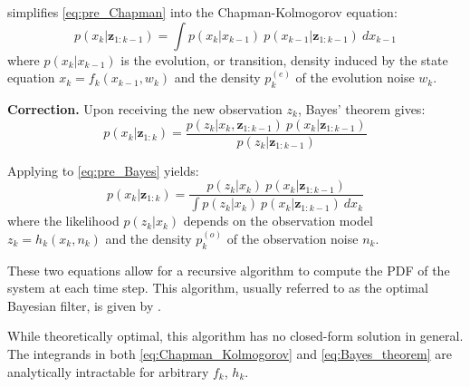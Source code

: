  simplifies \eqref{eq:pre_Chapman} into the Chapman-Kolmogorov equation:
\begin{equation}
	p(x_k|\mathbf{z}_{1:k-1})=\int{p(x_k|x_{k-1})\:p(x_{k-1}|\mathbf{z}_{1:k-1})\:dx_{k-1}}\label{eq:Chapman_Kolmogorov}
\end{equation}
where $p(x_k|x_{k-1})$ is the evolution, or transition, density induced by the state equation $x_k=f_k(x_{k-1},w_k)$ and the density $p_k^{(e)}$ of the evolution noise $w_k$.

\textbf{Correction.} Upon receiving the new observation $z_k$, Bayes' theorem gives:
\begin{equation}
	p(x_k|\mathbf{z}_{1:k})=\frac{p(z_k|x_k,\mathbf{z}_{1:k-1})\:p(x_k|\mathbf{z}_{1:k-1})}{p(z_k|\mathbf{z}_{1:k-1})}\label{eq:pre_Bayes}
\end{equation}

Applying  to \eqref{eq:pre_Bayes} yields:
\begin{equation}
	p(x_k|\mathbf{z}_{1:k})=\frac{p(z_k|x_k)\:p(x_k|\mathbf{z}_{1:k-1})}{\displaystyle\int{p(z_k|x_k)\:p(x_k|\mathbf{z}_{1:k-1})\:dx_k}}\label{eq:Bayes_theorem}
\end{equation}
where the likelihood $p(z_k|x_k)$ depends on the observation model $z_k=h_k(x_k,n_k)$ and the density $p_k^{(o)}$ of the observation noise $n_k$.

These two equations allow for a recursive algorithm to compute the PDF of the system at each time step. This algorithm, usually referred to as the optimal Bayesian filter, is given by .

\begin{algorithm}[ht]
	\begin{algorithmic}
	\end{algorithmic}\caption{Optimal Bayesian Filtering Algorithm}\label{alg:optimal_estimation}
\end{algorithm}

While theoretically optimal, this algorithm has no closed-form solution in general. The integrands in both \eqref{eq:Chapman_Kolmogorov} and \eqref{eq:Bayes_theorem} are analytically intractable for arbitrary $f_k$, $h_k$.

